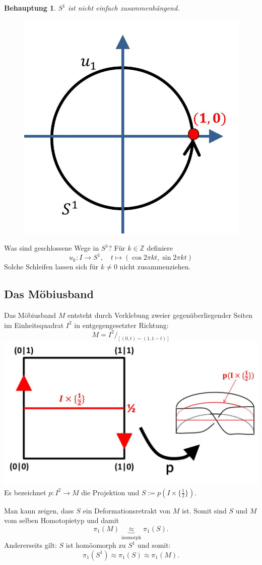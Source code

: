 \documentclass[a4paper,11pt,notitlepage]{report}
\newtheorem{beh}{Behauptung}[chapter]
\newcommand{\Z}{{\ensuremath{\mathbb{Z}}}}
\begin{document}
\begin{beh}
	$S^1$ ist nicht einfach zusammenhängend.
	\begin{figure}[h]
	\includegraphics[scale=0.4]{images/S1_nichttrivialer_Weg.jpg}
	\end{figure}
\end{beh}
Was sind geschlossene Wege in $S^1$?
\newline
Für $ k \in \Z$ definiere
$$u_k \colon I \rightarrow S^1, \quad t \mapsto (\cos 2 \pi k t, \sin 2 \pi k t)$$
Solche Schleifen lassen sich für $k \neq 0$ nicht zusammenziehen.

\subsection{Das Möbiusband}
Das Möbiusband $M$ entsteht durch Verklebung zweier gegenüberliegender Seiten im Einheitsquadrat $I^2$ in entgegengesetzter Richtung:
$$M = I^2/_{[(0,t) \sim (1, 1-t)]}$$
	\includegraphics[scale=0.4]{images/Moebiusband.jpg}
\newline
Es bezeichnet $p \colon I^2 \rightarrow M$ die Projektion und $S:= p(I \times \{\frac{1}{2}\})$.

Man kann zeigen, dass $S$ ein Deformationsretrakt von $M$ ist.
\newline
Somit sind $S$ und $M$ vom selben Homotopietyp und damit $$\pi_1(M) \underbrace{\approx}_{\text{isomorph}} \pi_1(S).$$
Andererseits gilt: $S$ ist homöomorph zu $S^1$ und somit: 
$$\pi_1(S^1) \approx \pi_1(S) \approx \pi_1(M).$$
\end{document}
